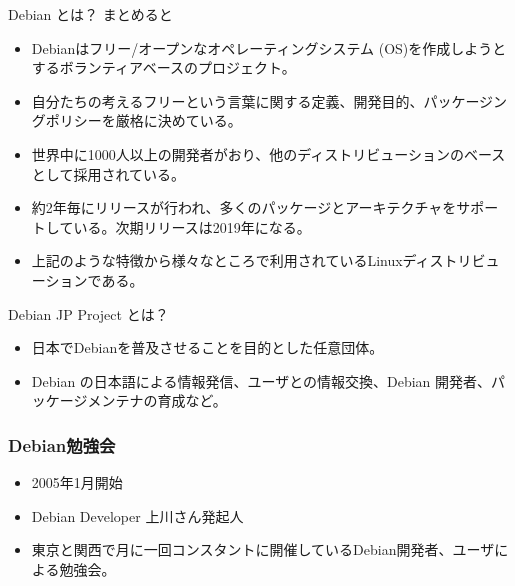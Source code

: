 \fi


\begin{frame}{Debian とは？}
まとめると\pause
\begin{itemize}[<+->]
\item Debianはフリー/オープンなオペレーティングシステム (OS)を作成しようとするボランティアベースのプロジェクト。
\item 自分たちの考えるフリーという言葉に関する定義、開発目的、パッケージングポリシーを厳格に決めている。
\item 世界中に1000人以上の開発者がおり、他のディストリビューションのベースとして採用されている。
\item 約2年毎にリリースが行われ、多くのパッケージとアーキテクチャをサポートしている。次期リリースは2019年になる。
\item 上記のような特徴から様々なところで利用されているLinuxディストリビューションである。
\end{itemize}

\end{frame}


\begin{frame}{Debian JP Project とは？}
\pause
\begin{itemize}[<+->]
\item 日本でDebianを普及させることを目的とした任意団体。
\item Debian の日本語による情報発信、ユーザとの情報交換、Debian 開発者、パッケージメンテナの育成など。
\end{itemize}
\end{frame}


\begin{frame}
\frametitle{Debian勉強会}
\begin{itemize}
 \item 2005年1月開始
 \item Debian Developer 上川さん発起人
\item 東京と関西で月に一回コンスタントに開催しているDebian開発者、ユーザによる勉強会。
\end{itemize}
\end{frame}

